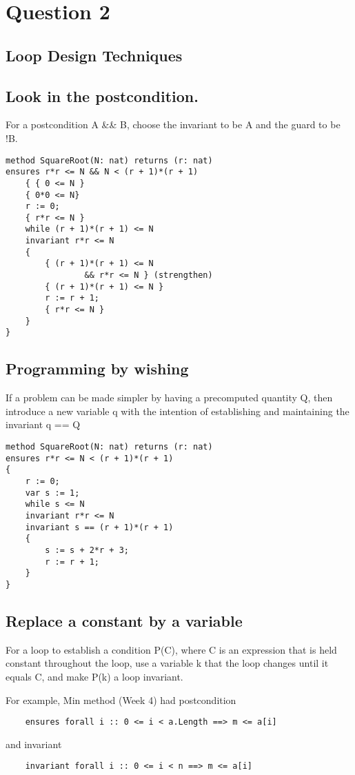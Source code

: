\section{Question 2}
\subsection{Loop Design Techniques}
\subsection{Look in the postcondition.}
For a postcondition A \&\& B,
choose the invariant to be A and the guard to be !B.
\begin{verbatim}
method SquareRoot(N: nat) returns (r: nat)
ensures r*r <= N && N < (r + 1)*(r + 1)
    { { 0 <= N }
    { 0*0 <= N}
    r := 0;
    { r*r <= N }
    while (r + 1)*(r + 1) <= N
    invariant r*r <= N
    {
        { (r + 1)*(r + 1) <= N 
                && r*r <= N } (strengthen)
        { (r + 1)*(r + 1) <= N }
        r := r + 1;
        { r*r <= N }
    }
}
\end{verbatim}

\subsection{Programming by wishing}
If a problem can be made simpler by having a
precomputed quantity Q, then introduce a new
variable q with the intention of establishing and
maintaining the invariant q == Q

\begin{verbatim}
method SquareRoot(N: nat) returns (r: nat)
ensures r*r <= N < (r + 1)*(r + 1)
{
    r := 0;
    var s := 1;
    while s <= N
    invariant r*r <= N
    invariant s == (r + 1)*(r + 1)
    {
        s := s + 2*r + 3;
        r := r + 1;
    }
}
\end{verbatim}

\subsection{Replace a constant by a variable}
For a loop to establish a condition P(C), where C is an
expression that is held constant throughout the loop,
use a variable k that the loop changes until it equals C,
and make P(k) a loop invariant.

For example, Min method (Week 4) had postcondition
\begin{verbatim}
    ensures forall i :: 0 <= i < a.Length ==> m <= a[i]
\end{verbatim}
and invariant
\begin{verbatim}
    invariant forall i :: 0 <= i < n ==> m <= a[i]
\end{verbatim}

